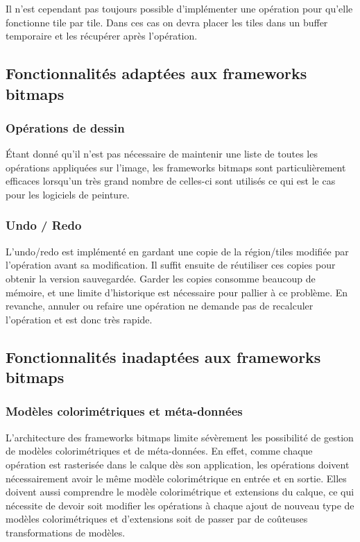 			Il n'est cependant pas toujours possible d'implémenter une opération pour qu'elle fonctionne tile par tile. Dans ces cas on devra placer
			les tiles dans un buffer temporaire et les récupérer après l'opération. 

		\subsection{Fonctionnalités adaptées aux frameworks bitmaps}
			\subsubsection{Opérations de dessin}
				Étant donné qu'il n'est pas nécessaire de maintenir une liste de toutes les opérations appliquées sur l'image, les frameworks
				bitmaps sont particulièrement efficaces lorsqu'un très grand nombre de celles-ci sont utilisés ce qui est le cas pour les
				logiciels de peinture. 
			\subsubsection{Undo / Redo}
				L'undo/redo est implémenté en gardant une copie de la région/tiles modifiée par l'opération avant sa modification. 
				Il suffit ensuite de réutiliser ces copies pour obtenir la version sauvegardée. Garder les copies consomme beaucoup de mémoire,
				et une limite d'historique est nécessaire pour pallier à ce problème. En revanche, annuler ou refaire une opération ne demande
				pas de recalculer l'opération et est donc très rapide.
		\subsection{Fonctionnalités inadaptées aux frameworks bitmaps}
			\subsubsection{Modèles colorimétriques et méta-données}
				L'architecture des frameworks bitmaps limite sévèrement les possibilité de gestion de modèles colorimétriques et de méta-données.
				En effet, comme chaque opération est rasterisée dans le calque dès son application, les opérations doivent nécessairement 
				avoir le même modèle colorimétrique en entrée et en sortie. Elles doivent aussi comprendre le modèle colorimétrique et extensions du 
				calque, ce qui nécessite de devoir soit modifier les opérations à chaque ajout de nouveau type de modèles colorimétriques et d'extensions
				soit de passer par de coûteuses transformations de modèles.

